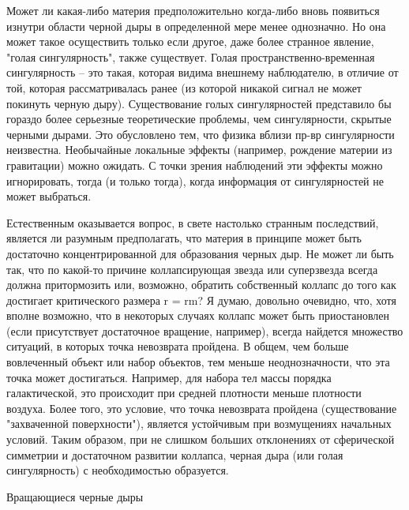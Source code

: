 \documentclass[a4paper, 10pt, twocolumn]{article}
\begin{document}
Может ли какая-либо материя предположительно когда-либо вновь появиться 
изнутри области черной дыры в определенной мере менее однозначно. Но она 
может такое осуществить только если другое, даже более странное явление, 
"голая сингулярность", также существует. Голая пространственно-временная 
сингулярность -- это такая, которая видима внешнему наблюдателю, 
в отличие от той, которая рассматривалась ранее (из которой никакой 
сигнал не может покинуть черную дыру). Существование голых 
сингулярностей представило бы гораздо более серьезные теоретические 
проблемы, чем сингулярности, скрытые черными дырами. Это обусловлено 
тем, что физика вблизи пр-вр сингулярности неизвестна. Необычайные 
локальные эффекты (например, рождение материи из гравитации) можно 
ожидать. С точки зрения наблюдений эти эффекты можно игнорировать, тогда 
(и только тогда), когда информация от сингулярностей не может выбраться.

Естественным оказывается вопрос, в свете настолько странным последствий, 
является ли разумным предполагать, что материя в принципе может быть 
достаточно концентрированной для образования черных дыр. Не может ли 
быть так, что по какой-то причине коллапсирующая звезда или суперзвезда 
всегда должна притормозить или, возможно, обратить собственный коллапс 
до того как достигает критического размера r = rm? Я думаю, довольно 
очевидно, что, хотя вполне возможно, что в некоторых случаях коллапс 
может быть приостановлен (если присутствует достаточное вращение, 
например), всегда найдется множество ситуаций, в которых точка 
невозврата пройдена. В общем, чем больше вовлеченный объект или набор 
объектов, тем меньше неоднозначности, что эта точка может достигаться. 
Например, для набора тел массы порядка галактической, это происходит при 
средней плотности меньше плотности воздуха. Более того, это условие, что 
точка невозврата пройдена (существование "захваченной поверхности"), 
является устойчивым при возмущениях начальных условий. Таким образом, 
при не слишком больших отклонениях от сферической симметрии 
и достаточном развитии коллапса, черная дыра (или голая сингулярность) 
с необходимостью образуется.



Вращающиеся черные дыры
\end{document}
